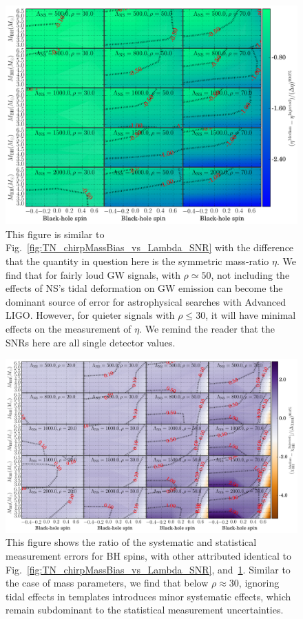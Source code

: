 \documentclass[aps,prd,amsmath,floats,floatfix, twocolumn,
superscriptaddress,nofootinbib,showpacs]{revtex4-1}
\begin{document}
\begin{figure}[!t]
\centering
\includegraphics[width=1.8\columnwidth]{plots/TNEtaBiasesOverCIWidths_CI90_0_Lambda_SNR30_70_linear002}
\caption{This figure is similar to Fig.~\ref{fig:TN_chirpMassBias_vs_Lambda_SNR}
with the difference that the quantity in question here is the symmetric 
mass-ratio $\eta$. We find that for fairly loud GW signals, with $\rho\simeq 50$,
not including the effects of NS's tidal deformation on GW emission can become the dominant
source of error for astrophysical searches with Advanced LIGO. However,
for quieter signals with $\rho\leq 30$, it will have minimal effects on the measurement
of $\eta$. We remind the reader that the SNRs here are all single detector values.
}
\label{fig:TN_EtaBias_vs_Lambda_SNR}
\end{figure}
% 
% 
\begin{figure}
\centering
\includegraphics[width=1.95\columnwidth]{plots/TNChiBHBiasesOverCIWidths_CI90_0_Lambda_SNR_linear}
\caption{This figure shows the ratio of the systematic and statistical
measurement errors for BH spins, with other attributed identical to 
Fig.~\ref{fig:TN_chirpMassBias_vs_Lambda_SNR}, and~\ref{fig:TN_EtaBias_vs_Lambda_SNR}.
Similar to the case of mass parameters, we find that below
$\rho\approx 30$, ignoring tidal effects in templates introduces minor systematic effects,
which remain subdominant to the statistical measurement uncertainties.
}
\label{fig:TN_BHspinBias_vs_Lambda_SNR}
\end{figure}
\end{document}
